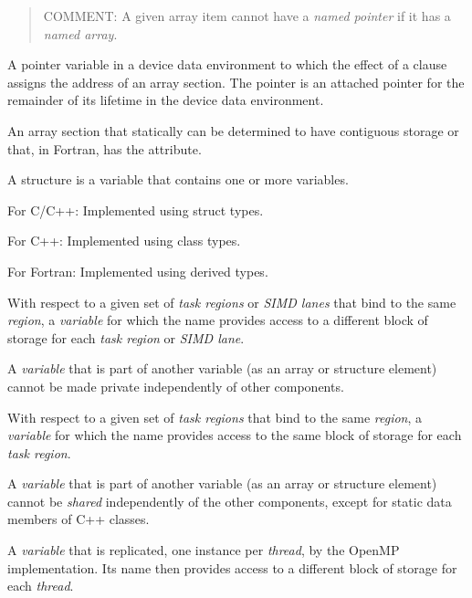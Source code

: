 \begin{quote}
COMMENT: A given array item cannot have a \emph{named pointer} if it has a \emph{named array}.
\end{quote}
\glossarydefend


\glossarydefstart
A pointer variable in a device data environment to which the effect of a  clause
assigns the address of
an array section.  The pointer is
an attached pointer for the remainder of its lifetime in the device data environment.
\glossarydefend
\bigskip

\glossarydefstart
An array section that statically can be determined to have contiguous storage or that, in Fortran, has the  attribute.
\glossarydefend
\bigskip

\glossarydefstart
A structure is a variable that contains one or more variables.

For C/C++:
\nopagebreak
Implemented using struct types.

For C++:
\nopagebreak
Implemented using class types.

For Fortran:
\nopagebreak
Implemented using derived types.
\glossarydefend

\glossarydefstart
With respect to a given set of \emph{task regions} or \emph{SIMD lanes} that bind to the same
 \emph{region}, a \emph{variable} for which the name provides access to a different block of
storage for each \emph{task region} or \emph{SIMD lane}.

A \emph{variable} that is part of another variable (as an array or structure element) cannot
be made private independently of other components.
\glossarydefend

\glossarydefstart
With respect to a given set of \emph{task regions} that bind to the same 
\emph{region}, a \emph{variable} for which the name provides access to the same block of storage for
each \emph{task region}.

A \emph{variable} that is part of another variable (as an array or structure element) cannot
be \emph{shared} independently of the other components, except for static data members
of C++ classes.
\glossarydefend

\glossarydefstart
A \emph{variable} that is replicated, one instance per \emph{thread}, by the OpenMP
implementation. Its name then provides access to a different block of storage for
each \emph{thread}.

